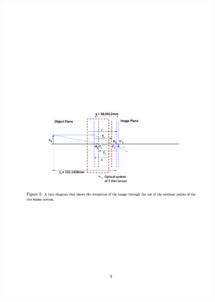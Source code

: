 \begin{figure}[h]
	
	\centering
	\includegraphics[width=1.0\linewidth]{__Images/09/Glytsis2014_5.png}
\end{figure}